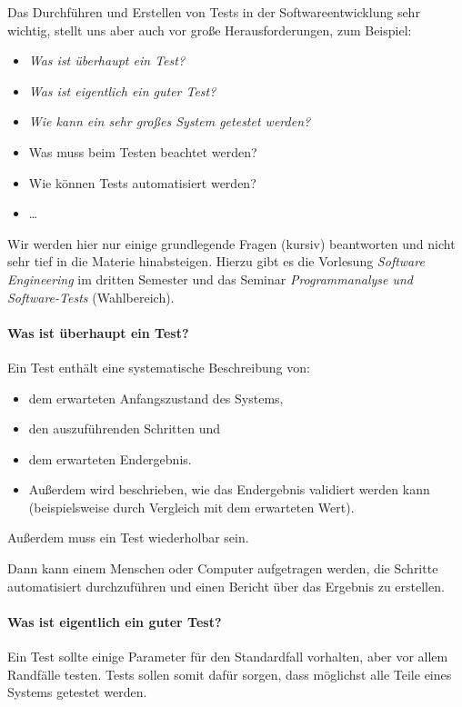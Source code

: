 
Das Durchführen und Erstellen von Tests in der Softwareentwicklung sehr wichtig, stellt uns aber auch vor große Herausforderungen, zum Beispiel:
\begin{itemize}
	\item \textit{Was ist überhaupt ein Test?}
	\item \textit{Was ist eigentlich ein guter Test?}
	\item \textit{Wie kann ein sehr großes System getestet werden?}
	\item Was muss beim Testen beachtet werden?
	\item Wie können Tests automatisiert werden?
	\item \dots
\end{itemize}

Wir werden hier nur einige grundlegende Fragen (kursiv) beantworten und nicht sehr tief in die Materie hinabsteigen. Hierzu gibt es die Vorlesung \textit{Software Engineering} im dritten Semester und das Seminar \textit{Programmanalyse und Software-Tests} (Wahlbereich).

\paragraph{Was ist überhaupt ein Test?}
	Ein Test enthält eine systematische Beschreibung von:
	\begin{itemize}
		\item dem erwarteten Anfangszustand des Systems,
		\item den auszuführenden Schritten und
		\item dem erwarteten Endergebnis.
		\item Außerdem wird beschrieben, wie das Endergebnis validiert werden kann (beispielsweise durch Vergleich mit dem erwarteten Wert).
	\end{itemize}
	Außerdem muss ein Test wiederholbar sein.
	
	Dann kann einem Menschen oder Computer aufgetragen werden, die Schritte automatisiert durchzuführen und einen Bericht über das Ergebnis zu erstellen.

\paragraph{Was ist eigentlich ein guter Test?}
	Ein Test sollte einige Parameter für den Standardfall vorhalten, aber vor allem Randfälle testen. Tests sollen somit dafür sorgen, dass möglichst alle Teile eines Systems getestet werden.
	
